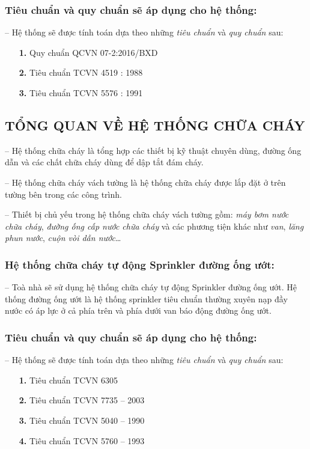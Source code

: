 	\subsubsection{Tiêu chuẩn và quy chuẩn sẽ áp dụng cho hệ thống:}
	\hspace{1cm}-- Hệ thống sẽ được tính toán dựa theo những \emph{tiêu chuẩn} và \emph{quy chuẩn} sau:
	\begin{itemize}[leftmargin=2cm]
		\item[\textbf{1.}]Quy chuẩn QCVN 07-2:2016/BXD
		\item[\textbf{2.}]Tiêu chuẩn TCVN 4519 : 1988
		\item[\textbf{3.}]Tiêu chuẩn TCVN 5576 : 1991
	\end{itemize}
	\subsection{TỔNG QUAN VỀ HỆ THỐNG CHỮA CHÁY}	
	-- Hệ thống chữa cháy là tổng hợp các thiết bị kỹ thuật chuyên dùng, đường ống dẫn và các chất chữa cháy dùng để dập tắt đám cháy.
	
	-- Hệ thống chữa cháy vách tường là hệ thống chữa cháy được lắp đặt ở trên tường bên trong các công trình.
	
	-- Thiết bị chủ yếu trong hệ thống chữa cháy vách tường gồm: \emph{máy bơm nước chữa cháy}, \emph{đường ống cấp nước chữa cháy} và các phương tiện khác như \emph{van}, \emph{lăng phun nước}, \emph{cuộn vòi dẫn nước}…
	
	\subsubsection{Hệ thống chữa cháy tự động Sprinkler đường ống ướt:}
	-- Toà nhà sẽ sử dụng hệ thống chữa cháy tự động Sprinkler đường ống ướt. Hệ thống đường ống ướt là hệ thống sprinkler tiêu chuẩn thường xuyên nạp đầy nước có áp lực ở cả phía trên và phía dưới van báo động đường ống ướt.
	\subsubsection{Tiêu chuẩn và quy chuẩn sẽ áp dụng cho hệ thống:}
	-- Hệ thống sẽ được tính toán dựa theo những \emph{tiêu chuẩn} và \emph{quy chuẩn} sau:
	\begin{itemize}[leftmargin=2cm]
		\item[\textbf{1.}]Tiêu chuẩn TCVN 6305 
		\item[\textbf{2.}]Tiêu chuẩn TCVN 7735 – 2003
		\item[\textbf{3.}]Tiêu chuẩn TCVN 5040 – 1990
		\item[\textbf{4.}]Tiêu chuẩn TCVN 5760 – 1993
	\end{itemize}
	

